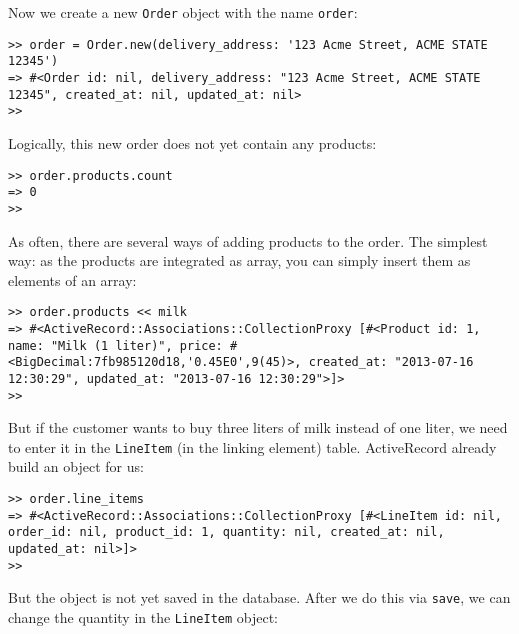 \documentclass[a4paper]{book}
\newcounter{tab}[chapter]
\begin{document}
Now we create a new \texttt{Order} object with the name \texttt{order}:

\begin{shaded}\begin{verbatim}
>> order = Order.new(delivery_address: '123 Acme Street, ACME STATE 12345')
=> #<Order id: nil, delivery_address: "123 Acme Street, ACME STATE 12345", created_at: nil, updated_at: nil>
>>
\end{verbatim}\end{shaded}

Logically, this new order does not yet contain any products:

\begin{shaded}\begin{verbatim}
>> order.products.count
=> 0
>>
\end{verbatim}\end{shaded}

As often, there are several ways of adding products to the order. The simplest way: as the products are integrated as array, you can simply insert them as elements of an array:

\begin{shaded}\begin{verbatim}
>> order.products << milk
=> #<ActiveRecord::Associations::CollectionProxy [#<Product id: 1, name: "Milk (1 liter)", price: #<BigDecimal:7fb985120d18,'0.45E0',9(45)>, created_at: "2013-07-16 12:30:29", updated_at: "2013-07-16 12:30:29">]>
>>
\end{verbatim}\end{shaded}

But if the customer wants to buy three liters of milk instead of one liter, we need to enter it in the \texttt{LineItem} (in the linking element) table. ActiveRecord already build an object for us:

\begin{shaded}\begin{verbatim}
>> order.line_items
=> #<ActiveRecord::Associations::CollectionProxy [#<LineItem id: nil, order_id: nil, product_id: 1, quantity: nil, created_at: nil, updated_at: nil>]>
>>
\end{verbatim}\end{shaded}

But the object is not yet saved in the database. After we do this via \texttt{save}, we can change the quantity in the \texttt{LineItem} object:
\end{document}

